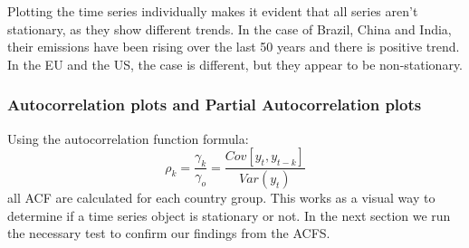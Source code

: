 \documentclass[
]{article}
\begin{document}
Plotting the time series individually makes it evident that all series
aren't stationary, as they show different trends. In the case of Brazil,
China and India, their emissions have been rising over the last 50 years
and there is positive trend. In the EU and the US, the case is
different, but they appear to be non-stationary.

\newpage

\hypertarget{autocorrelation-plots-and-partial-autocorrelation-plots}{%
\subsubsection{Autocorrelation plots and Partial Autocorrelation
plots}\label{autocorrelation-plots-and-partial-autocorrelation-plots}}

Using the autocorrelation function formula: \[\rho_k =
\frac{\gamma_k}{\gamma_o}=\frac{Cov[y_t,y_{t-k}]}{Var(y_t)}\] all ACF
are calculated for each country group. This works as a visual way to
determine if a time series object is stationary or not. In the next
section we run the necessary test to confirm our findings from the ACFS.
\end{document}
